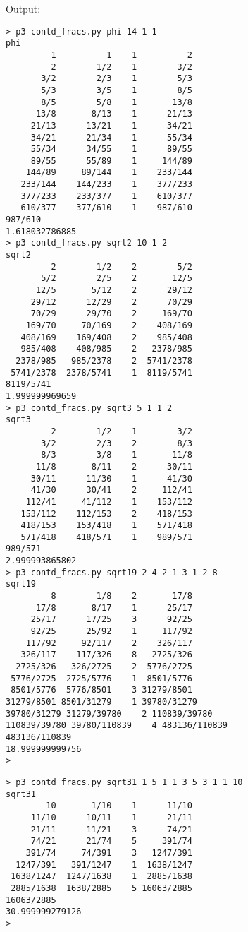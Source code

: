 \documentclass[11pt, oneside]{article}
\begin{document}
Output:

\begin{verbatim}
> p3 contd_fracs.py phi 14 1 1            
phi
         1          1    1          2
         2        1/2    1        3/2
       3/2        2/3    1        5/3
       5/3        3/5    1        8/5
       8/5        5/8    1       13/8
      13/8       8/13    1      21/13
     21/13      13/21    1      34/21
     34/21      21/34    1      55/34
     55/34      34/55    1      89/55
     89/55      55/89    1     144/89
    144/89     89/144    1    233/144
   233/144    144/233    1    377/233
   377/233    233/377    1    610/377
   610/377    377/610    1    987/610
987/610
1.618032786885
> p3 contd_fracs.py sqrt2 10 1 2          
sqrt2
         2        1/2    2        5/2
       5/2        2/5    2       12/5
      12/5       5/12    2      29/12
     29/12      12/29    2      70/29
     70/29      29/70    2     169/70
    169/70     70/169    2    408/169
   408/169    169/408    2    985/408
   985/408    408/985    2   2378/985
  2378/985   985/2378    2  5741/2378
 5741/2378  2378/5741    1  8119/5741
8119/5741
1.999999969659
> p3 contd_fracs.py sqrt3 5 1 1 2         
sqrt3
         2        1/2    1        3/2
       3/2        2/3    2        8/3
       8/3        3/8    1       11/8
      11/8       8/11    2      30/11
     30/11      11/30    1      41/30
     41/30      30/41    2     112/41
    112/41     41/112    1    153/112
   153/112    112/153    2    418/153
   418/153    153/418    1    571/418
   571/418    418/571    1    989/571
989/571
2.999993865802
> p3 contd_fracs.py sqrt19 2 4 2 1 3 1 2 8
sqrt19
         8        1/8    2       17/8
      17/8       8/17    1      25/17
     25/17      17/25    3      92/25
     92/25      25/92    1     117/92
    117/92     92/117    2    326/117
   326/117    117/326    8   2725/326
  2725/326   326/2725    2  5776/2725
 5776/2725  2725/5776    1  8501/5776
 8501/5776  5776/8501    3 31279/8501
31279/8501 8501/31279    1 39780/31279
39780/31279 31279/39780    2 110839/39780
110839/39780 39780/110839    4 483136/110839
483136/110839
18.999999999756
>
\end{verbatim}

\begin{verbatim}
> p3 contd_fracs.py sqrt31 1 5 1 1 3 5 3 1 1 10
sqrt31
        10       1/10    1      11/10
     11/10      10/11    1      21/11
     21/11      11/21    3      74/21
     74/21      21/74    5     391/74
    391/74     74/391    3   1247/391
  1247/391   391/1247    1  1638/1247
 1638/1247  1247/1638    1  2885/1638
 2885/1638  1638/2885    5 16063/2885
16063/2885
30.999999279126
>
\end{verbatim}
\end{document}
